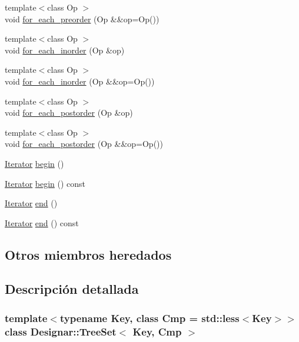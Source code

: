 \begin{DoxyCompactItemize}
\item 
{\footnotesize template$<$class Op $>$ }\\void \hyperlink{class_designar_1_1_tree_set_a45484640b06b18673646c606cf278e08}{for\+\_\+each\+\_\+preorder} (Op \&\&op=Op())
\item 
{\footnotesize template$<$class Op $>$ }\\void \hyperlink{class_designar_1_1_tree_set_af57ef3d8bb57487085079df5b5da4139}{for\+\_\+each\+\_\+inorder} (Op \&op)
\item 
{\footnotesize template$<$class Op $>$ }\\void \hyperlink{class_designar_1_1_tree_set_a0b3e506271289cc4e1e1fa3ce3ae9113}{for\+\_\+each\+\_\+inorder} (Op \&\&op=Op())
\item 
{\footnotesize template$<$class Op $>$ }\\void \hyperlink{class_designar_1_1_tree_set_ab59aacf4ca7cfe6c3753b5c4bd6c45e8}{for\+\_\+each\+\_\+postorder} (Op \&op)
\item 
{\footnotesize template$<$class Op $>$ }\\void \hyperlink{class_designar_1_1_tree_set_ae00442533ecacddca2c61bfbbc2c0c94}{for\+\_\+each\+\_\+postorder} (Op \&\&op=Op())
\item 
\hyperlink{class_designar_1_1_tree_set_1_1_iterator}{Iterator} \hyperlink{class_designar_1_1_tree_set_a2b51174c1290413611f407d54a3e5104}{begin} ()
\item 
\hyperlink{class_designar_1_1_tree_set_1_1_iterator}{Iterator} \hyperlink{class_designar_1_1_tree_set_ae2bb7c7ab6f5079bc8995821aa9bedfb}{begin} () const
\item 
\hyperlink{class_designar_1_1_tree_set_1_1_iterator}{Iterator} \hyperlink{class_designar_1_1_tree_set_a4069f037294163ea3686689c04486c58}{end} ()
\item 
\hyperlink{class_designar_1_1_tree_set_1_1_iterator}{Iterator} \hyperlink{class_designar_1_1_tree_set_a199fd4c6fa4e0ad40be0477fef024d9d}{end} () const
\end{DoxyCompactItemize}
\subsection*{Otros miembros heredados}


\subsection{Descripción detallada}
\subsubsection*{template$<$typename Key, class Cmp = std\+::less$<$\+Key$>$$>$\newline
class Designar\+::\+Tree\+Set$<$ Key, Cmp $>$}



